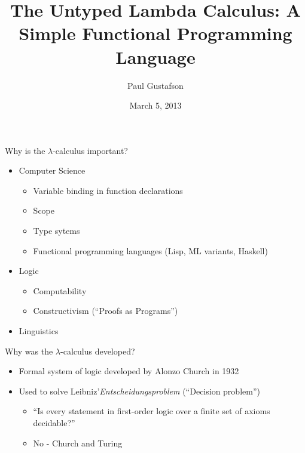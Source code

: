 \documentclass{beamer}
\title{The Untyped Lambda Calculus: A Simple Functional Programming Language}
\author{Paul Gustafson}
\institute{Math 482 - Texas A\&M University}
\date{March 5, 2013}
\begin{document}
\begin{frame}
\titlepage
\end{frame}


\begin{frame}{Why is the $\lambda$-calculus important?}
\begin{itemize}
\item Computer Science 
\begin{itemize}
\item Variable binding in function declarations
\item Scope
\item Type sytems
\item Functional programming languages (Lisp, ML variants, Haskell)
\end{itemize}
\item Logic
\begin{itemize}
\item Computability
\item Constructivism (``Proofs as Programs'')
\end{itemize}
\item Linguistics
\end{itemize}
\end{frame}

\begin{frame}{Why was the $\lambda$-calculus developed?}
\begin{itemize}
\item Formal system of logic developed by Alonzo Church in 1932
\item Used to solve Leibniz'\emph{Entscheidungsproblem} (``Decision problem'')
\begin{itemize}
\item ``Is every statement in first-order logic over a finite set of axioms decidable?''
\item No - Church and Turing 
\end{itemize}
\end{itemize}
\end{frame}
\end{document}
